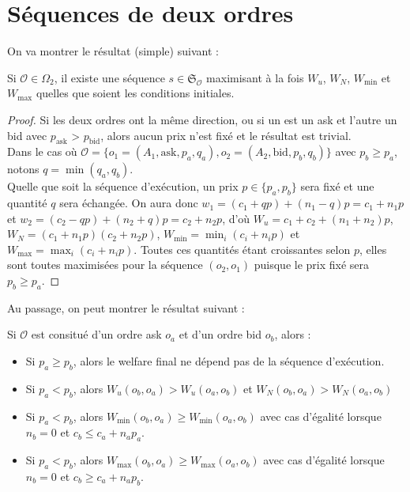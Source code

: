 \documentclass[a4paper]{article}
\newcommand{\Sg}{\mathfrak{S}}
\newcommand{\Oc}{\mathcal{O}}
\newtheorem[style=S, bodystyle=\noindent]{thm}{Théorème}[section]
\newtheorem[style=S, bodystyle=\noindent]{defn}[thm]{Définition}
\newtheorem[style=S, bodystyle=\noindent]{propo}[thm]{Proposition}
\newtheorem[style=S, bodystyle=\noindent]{prop}[thm]{Propriété}
\newtheorem[style=S, bodystyle=\noindent]{coro}[thm]{Corollaire}
\newtheorem[style=S, bodystyle=\noindent]{lem}[thm]{Lemme}
\newtheorem[style=S, headstyle=\bfseries\boldmath Théorème, bodystyle=\noindent]{thm*}{Théorème}
\newtheorem[style=S, headstyle=\bfseries\boldmath Définition, bodystyle=\noindent]{defn*}{Définition}
\newtheorem[style=S, headstyle=\bfseries\boldmath Proposition, bodystyle=\noindent]{propo*}{Proposition}
\newtheorem[style=S, headstyle=\bfseries\boldmath Propriété, bodystyle=\noindent]{prop*}{Propriété}
\newtheorem[style=S, headstyle=\bfseries\boldmath Corollaire, bodystyle=\noindent]{coro*}{Corollaire}
\newtheorem[style=S, headstyle=\bfseries\boldmath Lemme, bodystyle=\noindent]{lem*}{Lemme}
\begin{document}
\section{Séquences de deux ordres}

On va montrer le résultat (simple) suivant :
\begin{prop}
Si $\Oc \in \Omega_2$, il existe une séquence $s \in \Sg_{\mathcal O}$ maximisant à la fois $W_u$, $W_N$, $W_{\min}$ et $W_{\max}$ quelles que soient les conditions initiales.
\end{prop}

\begin{proof}
Si les deux ordres ont la même direction, ou si un est un ask et l'autre un bid avec $p_\text{ask}$ > $p_\text{bid}$, alors aucun prix n'est fixé et le résultat est trivial. \\
Dans le cas où $\mathcal O = \{o_1 = (A_1, \text{ask}, p_a, q_a), o_2 = (A_2, \text{bid}, p_b, q_b)\}$ avec $p_b \geq p_a$, notons $q = \min(q_a,q_b)$. \\
Quelle que soit la séquence d'exécution, un prix $p\in\{p_a,p_b\}$ sera fixé et une quantité $q$ sera échangée. On aura donc $w_1 = (c_1 + qp) + (n_1-q)p = c_1+n_1p$ et $w_2 = (c_2 - qp) + (n_2+q)p = c_2+n_2p$, d'où $W_u = c_1+c_2+(n_1+n_2)p$, $W_N = (c_1+n_1p)(c_2+n_2p)$, $W_{\min} = \min_i(c_i + n_ip)$ et $W_{\max} = \max_i(c_i + n_ip)$. Toutes ces quantités étant croissantes selon $p$, elles sont toutes maximisées pour la séquence $(o_2, o_1)$ puisque le prix fixé sera $p_b \geq p_a$.
\end{proof}

Au passage, on peut montrer le résultat suivant :
\begin{prop}
\label{prop1}
Si $\mathcal O$ est consitué d'un ordre ask $o_a$ et d'un ordre bid $o_b$, alors :
\begin{itemize}
	\item Si $p_a \geq p_b$, alors le welfare final ne dépend pas de la séquence d'exécution.
	\item Si $p_a < p_b$, alors $W_u(o_b,o_a) > W_u(o_a,o_b)$ et $W_N(o_b,o_a) > W_N(o_a,o_b)$
	\item Si $p_a < p_b$, alors $W_{\min}(o_b,o_a) \geq W_{\min}(o_a,o_b)$ avec cas d'égalité lorsque $n_b = 0$ et $c_b \leq c_a + n_ap_a$.
	\item Si $p_a < p_b$, alors $W_{\max}(o_b,o_a) \geq W_{\max}(o_a,o_b)$ avec cas d'égalité lorsque $n_b = 0$ et $c_b \geq c_a + n_ap_b$.
\end{itemize}
\end{prop}
\end{document}
